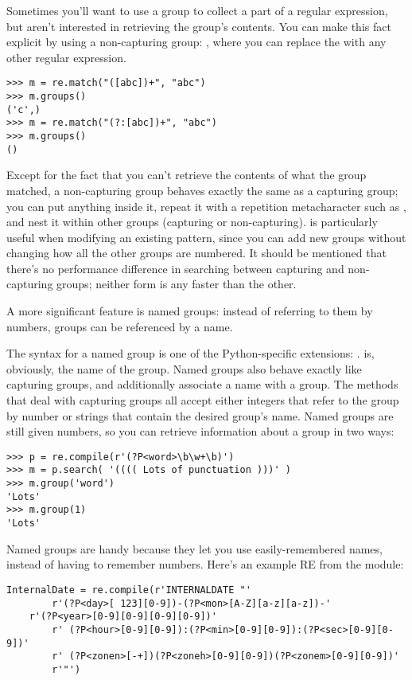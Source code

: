 \documentclass{howto}
\begin{document}
Sometimes you'll want to use a group to collect a part of a regular
expression, but aren't interested in retrieving the group's contents.
You can make this fact explicit by using a non-capturing group:
, where you can replace the 
with any other regular expression.

\begin{verbatim}
>>> m = re.match("([abc])+", "abc")
>>> m.groups()
('c',)
>>> m = re.match("(?:[abc])+", "abc")
>>> m.groups()
()
\end{verbatim}

Except for the fact that you can't retrieve the contents of what the
group matched, a non-capturing group behaves exactly the same as a
capturing group; you can put anything inside it, repeat it with a
repetition metacharacter such as \samp{*}, and nest it within other
groups (capturing or non-capturing).   is particularly
useful when modifying an existing pattern, since you can add new groups
without changing how all the other groups are numbered.  It should be
mentioned that there's no performance difference in searching between
capturing and non-capturing groups; neither form is any faster than
the other.

A more significant feature is named groups: instead of
referring to them by numbers, groups can be referenced by a name.

The syntax for a named group is one of the Python-specific extensions:
.   is, obviously, the name of
the group.  Named groups also behave exactly like capturing groups,
and additionally associate a name with a group.  The
 methods that deal with capturing groups all accept
either integers that refer to the group by number or strings that
contain the desired group's name.  Named groups are still given
numbers, so you can retrieve information about a group in two ways:

\begin{verbatim}
>>> p = re.compile(r'(?P<word>\b\w+\b)')
>>> m = p.search( '(((( Lots of punctuation )))' )
>>> m.group('word')
'Lots'
>>> m.group(1)
'Lots'
\end{verbatim}

Named groups are handy because they let you use easily-remembered
names, instead of having to remember numbers.  Here's an example RE
from the  module:

\begin{verbatim}
InternalDate = re.compile(r'INTERNALDATE "'
        r'(?P<day>[ 123][0-9])-(?P<mon>[A-Z][a-z][a-z])-'
	r'(?P<year>[0-9][0-9][0-9][0-9])'
        r' (?P<hour>[0-9][0-9]):(?P<min>[0-9][0-9]):(?P<sec>[0-9][0-9])'
        r' (?P<zonen>[-+])(?P<zoneh>[0-9][0-9])(?P<zonem>[0-9][0-9])'
        r'"')
\end{verbatim}
\end{document}
